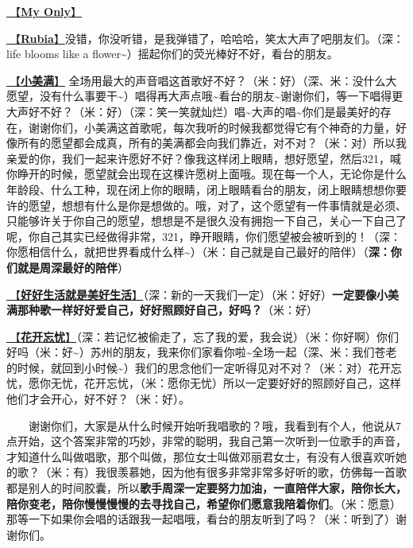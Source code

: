 \documentclass[]{ctexbook}
\begin{document}
\hyperref[my-only]{🎵【\textbf{My Only}】}

\hyperref[rubia]{🎵【\textbf{Rubia}】}没错，你没听错，是我弹错了，哈哈哈，笑太大声了吧朋友们。（深：life blooms like a flower\textasciitilde）摇起你们的荧光棒好不好，看台的朋友。

\hyperref[happy-ending]{🎵【\textbf{小美满}】} 全场用最大的声音唱这首歌好不好？（米：好）（深、米：没什么大愿望，没有什么事要干\textasciitilde）唱得再大声点哦\textasciitilde 看台的朋友\textasciitilde 谢谢你们，等一下唱得更大声好不好？（米：好）（深：笑一笑就灿烂）唱\textasciitilde 大声的唱\textasciitilde 你们是最美好的存在，谢谢你们，小美满这首歌呢，每次我听的时候我都觉得它有个神奇的力量，好像所有的愿望都会成真，所有的美满都会向我们靠近，对不对？（米：对）所以我亲爱的你，我们一起来许愿好不好？像我这样闭上眼睛，想好愿望，然后321，喊你睁开的时候，愿望就会出现在这棵许愿树上面哦。现在每一个人，无论你是什么年龄段、什么工种，现在闭上你的眼睛，闭上眼睛看台的朋友，闭上眼睛想想你要许的愿望，想想有什么是你是想做的。哦，对了，这个愿望有一件事情就是必须、只能够许关于你自己的愿望，想想是不是很久没有拥抱一下自己，关心一下自己了呢，你自己其实已经做得非常，321，睁开眼睛，你们愿望被会被听到的！（深：你愿相信什么，就把世界看成什么样\textasciitilde）（米：自己就是自己最好的陪伴）（\textbf{深：你们就是周深最好的陪伴}）

\hyperref[live-happy-life-happy]{🎵【\textbf{好好生活就是美好生活}】}（深：新的一天我们一定）（米：好好）\textbf{一定要像小美满那种歌一样好好爱自己，好好照顾好自己，好吗？}（米：好）

\hyperref[no-worries]{🎵【\textbf{花开忘忧}】}（深：若记忆被偷走了，忘了我的爱，我会说）（米：你好啊）你们好吗（米：好\textasciitilde）苏州的朋友，我来你们家看你啦\textasciitilde 全场一起（深、米：我们苍老的时候，就回到小时候\textasciitilde）我们的思念他们一定听得见对不对？（米：对）花开忘忧，愿你无忧，花开忘忧，（米：愿你无忧）所以一定要好好的照顾好自己，这样他们才会开心，好不好？（米：好）。

  谢谢你们，大家是从什么时候开始听我唱歌的？哦，我看到有个人，他说从7点开始，这个答案非常的巧妙，非常的聪明，我自己第一次听到一位歌手的声音，才知道什么叫做唱歌，那个叫做，那位女士叫做邓丽君女士，有没有人很喜欢听她的歌？（米：有）我很羡慕她，因为他有很多非常非常多好听的歌，仿佛每一首歌都是别人的时间胶囊，所以\textbf{歌手周深一定要努力加油，一直陪伴大家，陪你长大，陪你变老，陪你慢慢慢慢的去寻找自己，希望你们愿意我陪着你们}。（米：愿意）那等一下如果你会唱的话跟我一起唱哦，看台的朋友听到了吗？（米：听到了）谢谢你们。
\end{document}

